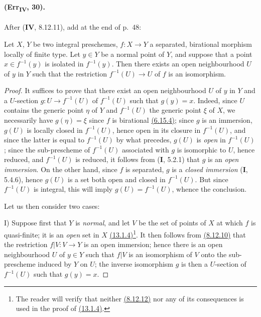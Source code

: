 \paragraph{(Err\textsubscript{\textmd{IV}}, 30).}
After (\textbf{IV}, 8.12.11), add at the end of p.~48:

\begin{corollary}[8.12.12]
\label{IV.8.12.12}
Let $X$, $Y$ be two integral preschemes,
$f:X\to Y$ a separated, birational morphism locally of finite type.
Let $y\in Y$ be a normal point of $Y$, and suppose that a point
$x\in f^{-1}(y)$ is isolated in $f^{-1}(y)$. Then there exists an
open neighbourhood $U$ of $y$ in $Y$ such that the restriction
$f^{-1}(U)\to U$ of $f$ is an isomorphism.
\end{corollary}

\begin{proof}
It suffices to prove that there exist an open neighbourhood $U$ of $y$ in
$Y$ and a $U$-section $g:U\to f^{-1}(U)$ of $f^{-1}(U)$ such that
$g(y)=x$. Indeed, since $U$ contains the generic point $\eta$ of
$Y$ and $f^{-1}(U)$ the generic point $\xi$ of $X$, we necessarily
have $g(\eta)=\xi$ since $f$ is birational
{\hyperref[IV.6.15.4]{(6.15.4)}}; since $g$ is an
immersion, $g(U)$ is locally closed in $f^{-1}(U)$, hence open
in its closure in $f^{-1}(U)$, and since the latter is equal
to $f^{-1}(U)$ by what precedes, $g(U)$ is \emph{open} in
$f^{-1}(U)$; since the sub-prescheme of $f^{-1}(U)$ associated with $g$ is
isomorphic to $U$, hence reduced, and $f^{-1}(U)$ is reduced, it follows
from (\textbf{I}, 5.2.1) that $g$ is an \emph{open immersion}. On the other hand, since
$f$ is separated, $g$ is a \emph{closed immersion} (\textbf{I}, 5.4.6), hence $g(U)$
is a set both open and closed in $f^{-1}(U)$. But since
$f^{-1}(U)$ is integral, this will imply $g(U)=f^{-1}(U)$, whence the
conclusion.

Let us then consider two cases:

\textup{I)} Suppose first that $Y$ is \emph{normal}, and let $V$ be the set of
points of $X$ at which $f$ is quasi-finite; it is an \emph{open} set
in $X$ {\hyperref[IV.13.1.4]{(13.1.4)}}\footnote{The
reader will verify that neither {\hyperref[IV.8.12.12]{(8.12.12)}}
nor any of its consequences is used in the proof of
{\hyperref[IV.13.1.4]{(13.1.4)}}.}. It then follows from
{\hyperref[IV.8.12.10]{(8.12.10)}}
that the restriction $f|V:V\to Y$ is an open immersion; hence there is
an open neighbourhood $U$ of $y\in Y$ such that $f|V$ is an isomorphism
of $V$ onto the sub-prescheme induced by $Y$ on $U$; the inverse
isomorphism $g$ is then a $U$-section of $f^{-1}(U)$ such that
$g(y)=x$.


\end{proof}
